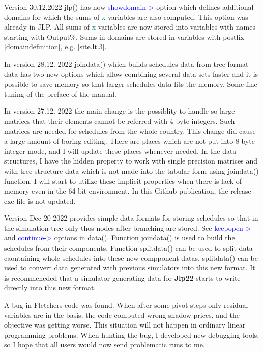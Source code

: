 Version 30.12.2022 \textcolor{VioletRed}{jlp}() has now \textcolor{blue}{showdomain->} option which defines additional domains for which the sums 
of \textcolor{teal}{x}-variables are also computed. This option was already in JLP. 
All sums of \textcolor{teal}{x}-variables are now stored into variables with names starting with Output\%. Sums 
in domains are stored in variables with postfix [domaindefinition], e.g. [site.lt.3]. 
 
In version 28.12. 2022 \textcolor{VioletRed}{joindata}() which builds schedules data from tree format data has two new options 
which allow combining several data sets faster and it is possible to save memory so that larger 
schedules data fits the memory. Some fine tuning of the preface of the manual. 
 
In version 27.12. 2022 the main change is the possiblity to handle so large matrices that their 
elements cannot be referred with 4-byte integers. Such matrices are needed for schedules from the whole 
country. This change did cause a large amount of boring editing. 
There are places which are not put into 8-byte integer mode, and I will update 
these places whenever needed. 
In the data structures, I have the hidden property to work with single precision matrices and with tree-structure 
data which is not made into the tabular form using \textcolor{VioletRed}{joindata}() function. I will start to 
utilize these implicit properties when there is lack of memory even in the 64-bit environment. 
In this Github publication, 
the release exe-file is not updated. 
 
Version Dec 20 2022 provides simple data formats for storing schedules so that in the simulation tree only thos 
nodes after branching are stored. See \textcolor{blue}{keepopen->} and \textcolor{blue}{continue->} options in \textcolor{VioletRed}{data}(). Function \textcolor{VioletRed}{joindata}() is 
used to build the schedules from their components. Function \textcolor{VioletRed}{splitdata}() can be used to split data caontaining whole 
schedules into these new compponent datas. \textcolor{VioletRed}{splitdata}() can be used to convert data generated with previous simulators 
into this new format. It is recommeneded that a simulator generating data for \textbf{Jlp22} 
starts to write directly into this new format. 
 
A bug in Fletchers code was found. When after some pivot steps only residual variables 
are in the basis, the code computed wrong shadow prices, and the objective was getting worse. 
This situation will not happen in ordinary linear programming problems. When hunting the bug, I developed new 
debugging tools, so I hope that all users would now send problematic 
runs to me. 
 
